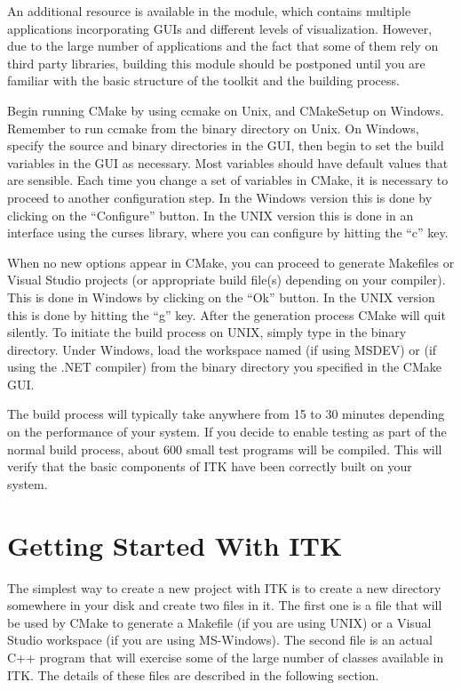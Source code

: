 An additional resource is available in the  module,
which contains multiple applications incorporating GUIs and different levels
of visualization.  However, due to the large number of applications and the
fact that some of them rely on third party libraries, building this module
should be postponed until you are familiar with the basic structure of the
toolkit and the building process. 

Begin running CMake by using
ccmake on Unix, and CMakeSetup on
Windows. Remember to run ccmake from the binary directory on Unix. On
Windows, specify the source and binary directories in the GUI, then begin to
set the build variables in the GUI as necessary.  Most variables should have
default values that are sensible. Each time you change a set of variables in
CMake, it is necessary to proceed to another configuration step. In the
Windows version this is done by clicking on the ``Configure'' button. In the
UNIX version this is done in an interface using the 
curses library, where you can configure by hitting the ``c'' key.

When no new options appear in CMake, you can proceed to generate Makefiles or
Visual Studio projects (or appropriate build file(s) depending on your
compiler). This is done in Windows by clicking on the ``Ok'' button.  In the
UNIX version this is done by hitting the ``g'' key. After the generation
process CMake will quit silently. To initiate the build process on UNIX,
simply type  in the binary directory. Under Windows, load the
workspace named  (if using MSDEV) or  (if using
the .NET compiler) from the binary directory you specified in the CMake GUI.

The build process will typically take anywhere from 15 to 30 minutes depending
on the performance of your system. If you decide to enable testing as part of
the normal build process, about 600 small test programs will be compiled. This
will verify that the basic components of ITK have been correctly built on your
system.


\section{Getting Started With ITK }
\label{sec:GettingStartedWithITK}
 
The simplest way to create a new project with ITK is to create a new directory
somewhere in your disk and create two files in it. The first one is a
 file that will be used by CMake to generate a Makefile
(if you are using UNIX) or a Visual Studio workspace (if you are using
MS-Windows).  The second file is an actual C++ program that will exercise
some of the large number of classes available in ITK. The details of these files
are described in the following section.

